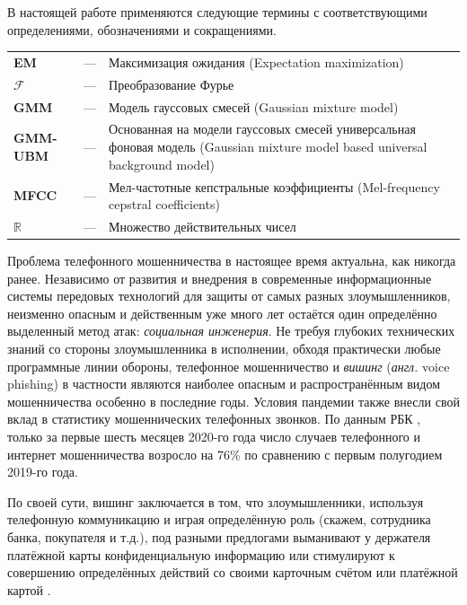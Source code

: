 \documentclass[12pt]{gost-7-32}
\begin{document}
\newpage
\tableofcontents

\newpage
\abbreviations

В настоящей работе применяются следующие термины с соответствующими определениями, обозначениями и сокращениями.

\vspace{1.0cm}

\begin{tabularx}{0.9 \textwidth}{
    >{\raggedright \arraybackslash \hsize=0.2\hsize}X
    >{\centering \arraybackslash \hsize=0.1\hsize}X
    >{\raggedright \arraybackslash \hsize=0.7\hsize}X
}
    \bf{EM} &---& Максимизация ожидания (Expectation maximization) \\
    $\mathcal{F}$ &---& Преобразование Фурье \\
    \bf{GMM} &---& Модель гауссовых смесей (Gaussian mixture model) \\
    \bf{GMM-UBM} &---& Основанная на модели гауссовых смесей универсальная фоновая модель (Gaussian mixture model based universal background model) \\
    \bf{MFCC} &---& Мел-частотные кепстральные коэффициенты (Mel-frequency cepstral coefficients) \\
    $\mathbb{R}$ &---& Множество действительных чисел \\
\end{tabularx}

\newpage
\introduction

Проблема телефонного мошенничества в настоящее время актуальна, как никогда ранее.
Независимо от развития и внедрения в современные информационные системы передовых технологий для защиты от самых разных злоумышленников, неизменно опасным и действенным уже много лет остаётся один определённо выделенный метод атак: \textit{социальная инженерия}.
Не требуя глубоких технических знаний со стороны злоумышленника в исполнении, обходя практически любые программные линии обороны, телефонное мошенничество и \textit{вишинг} (\textit{англ.} voice phishing) в частности являются наиболее опасным и распространённым видом мошенничества особенно в последние годы.
Условия пандемии также внесли свой вклад в статистику мошеннических телефонных звонков.
По данным РБК \cite{rbk}, только за первые шесть месяцев 2020-го года число случаев телефонного и интернет мошенничества возросло на 76\% по сравнению с первым полугодием 2019-го года.

По своей сути, вишинг заключается в том, что злоумышленники, используя телефонную коммуникацию и играя определённую роль (скажем, сотрудника банка, покупателя и т.д.), под разными предлогами выманивают у держателя платёжной карты конфиденциальную информацию или стимулируют к совершению определённых действий со своими карточным счётом или платёжной картой \cite{york_vishing, fishing_book}.
\end{document}
